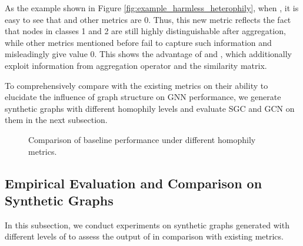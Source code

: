 \documentclass{article}
\newcommand{\0}{{\boldsymbol{0}}}
\newcommand{\6}{{\partial}}
\newcommand{\8}{{\infty}}
\newcommand{\4}{{\nabla}}
\begin{document}
As the example shown in Figure \ref{fig:example_harmless_heterophily}, when , it is easy to see that  and other metrics are 0. Thus, this new metric reflects the fact that nodes in classes 1 and 2 are still highly distinguishable after aggregation, while other metrics mentioned before fail to capture such information and misleadingly give value 0. This shows the advantage of  and , which additionally exploit information from aggregation operator  and the similarity matrix.

To comprehensively compare  with the existing metrics on their ability to elucidate the influence of graph structure on GNN performance, we generate synthetic graphs with different homophily levels and evaluate SGC \cite{wu2019simplifying} and GCN \cite{kipf2016classification} on them in the next subsection.
\begin{figure*}[htbp]
\centering
    {
     }
     \caption{Comparison of baseline performance under different homophily metrics.}
     \label{fig:comparison_homophily_metrics}
\end{figure*}

\subsection{Empirical Evaluation and Comparison on Synthetic Graphs}
\vspace{-0.1cm}
In this subsection, we conduct experiments on synthetic graphs generated with different levels of  to assess the output of  in comparison with existing metrics.
\vspace{-0.2cm}
\end{document}
